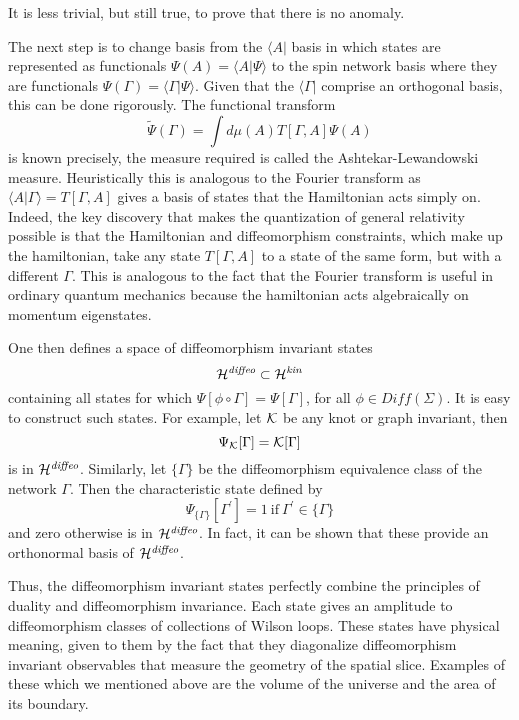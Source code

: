 \documentclass[12pt]{article}
\newcommand{\f}{\begin{equation}}
\newcommand{\ff}{\end{equation}}
\begin{document}
It is less trivial, but still true, to prove that there is no anomaly.  

The next step is to change basis from the $\langle A| $ basis
in which states are represented as functionals $\Psi (A)= \langle A|\Psi \rangle$ 
 to the spin network
basis where they are functionals $\Psi (\Gamma ) = \langle\Gamma |\Psi \rangle$.
Given that the $\langle\Gamma |$ comprise an orthogonal basis, this
can be done rigorously.  The functional transform 
\f
\tilde{\Psi} (\Gamma ) = \int d\mu (A) T[\Gamma , A] \Psi (A)
\ff
is known precisely, the measure required is called the
Ashtekar-Lewandowski measure.  Heuristically this is analogous to the Fourier
transform as $\langle A|\Gamma \rangle = T[\Gamma , A]$ gives a basis of states that
the Hamiltonian acts simply on.  Indeed, the key discovery that makes the
quantization of general relativity 
 possible is that the Hamiltonian and diffeomorphism constraints,
which make up the hamiltonian, take any state $ T[\Gamma , A]$ to a state
of the same form, but with a different $\Gamma$.  This is analogous to the fact
that the Fourier transform is useful in ordinary quantum mechanics because the
hamiltonian acts algebraically on momentum eigenstates. 

One then defines a space of diffeomorphism invariant states
\f
{\cal H}^{\it diffeo} \subset {\cal H}^{\it kin}
\ff 
containing all states for which $\Psi [\phi \circ \Gamma ] = \Psi [\Gamma ]$,
for all $\phi \in Diff( \Sigma )$.  It is easy to  construct such states. For example,
let ${\cal K}$ be any knot or graph invariant, then 
\f
\Psi_{\cal K}[\Gamma ]={\cal K}[\Gamma ]
\ff
is in ${\cal H}^{\it diffeo}$.    Similarly, let $\{ \Gamma \} $ be the diffeomorphism 
equivalence class of
the network $\Gamma $. Then the characteristic state defined by 
\f
\Psi_{\{ \Gamma \} } [\Gamma^\prime  ] = 1 \  \mbox{if}  \  \Gamma^\prime \in \{ \Gamma \} 
\ff
and zero otherwise is in ${\cal H}^{\it diffeo}$. In fact, it can be shown that these
provide an orthonormal basis of ${\cal H}^{\it diffeo}$.  

Thus, the diffeomorphism invariant states perfectly combine the principles of
duality and diffeomorphism invariance.  Each state gives an amplitude to
diffeomorphism classes of collections of Wilson loops.  These states have
physical meaning, given to them by the fact that they diagonalize diffeomorphism
invariant observables that measure the geometry of the 
spatial slice. Examples of these which we mentioned 
above are the volume of the universe and the area of its boundary.  
\end{document}
